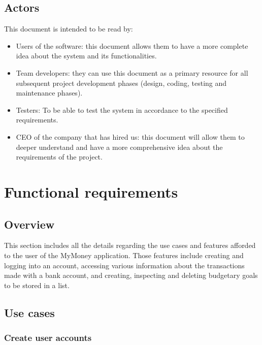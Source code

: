 \documentclass[letterpaper]{article}
\begin{document}
	\subsection{Actors}
	
		This document is intended to be read by:
		
		\begin{itemize}
			
			\item Users of the software: this document allows them to have a more complete idea about the system and its functionalities.
			
			\item Team developers: they can use this document as a primary resource for all subsequent project development phases (design, coding, testing and maintenance phases).
			
			\item Testers: To be able to test the system in accordance to the specified requirements.
			
			\item CEO of the company that has hired us: this document will allow them to deeper understand and have a more comprehensive idea about the requirements of the project.
			
		\end{itemize}

\section{Functional requirements}

	\subsection{Overview}
	
		This section includes all the details regarding the use cases and features afforded to the user of the MyMoney application. Those features include creating and logging into an account, accessing various information about the transactions made with a bank account, and creating, inspecting and deleting budgetary goals to be stored in a list.
	
	\subsection{Use cases}
	
		\subsubsection{Create user accounts}
		
\end{document}
